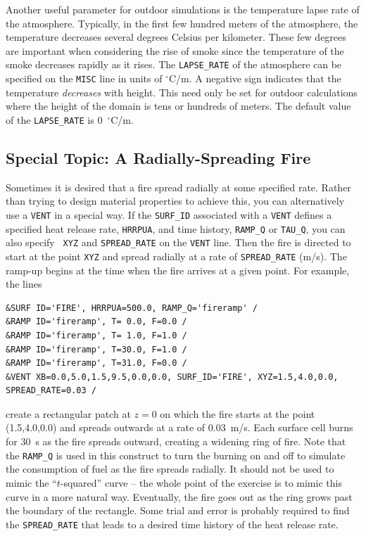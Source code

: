 \documentclass[11pt]{book}
\newcommand{\ct}{\tt\small}
\begin{document}
Another useful parameter for outdoor simulations is the temperature
lapse rate of the atmosphere. Typically, in the first few hundred meters
of the atmosphere, the temperature decreases several degrees Celsius
per kilometer. These few degrees are important when considering the rise
of smoke since the temperature of the smoke decreases rapidly as it
rises. The {\ct LAPSE\_RATE} of the atmosphere can be specified on the
{\ct MISC} line in units of $^\circ$C/m. A negative sign indicates that the
temperature {\em decreases} with height.
This need only be set for outdoor calculations where the height of the
domain is tens or hundreds of meters.
The default value of the {\ct LAPSE\_RATE} is 0~$^\circ$C/m.


\subsection{Special Topic: A Radially-Spreading Fire}

Sometimes it is desired that a fire spread radially at some specified
rate. Rather than trying to design material properties
to achieve this, you can alternatively use a {\ct VENT} in a special way.
If the {\ct SURF\_ID} associated with a {\ct VENT}
defines a specified heat release rate, {\ct HRRPUA}, and
time history, {\ct RAMP\_Q} or {\ct TAU\_Q}, you can also specify {\ct
XYZ} and {\ct SPREAD\_RATE} on the {\ct VENT} line.
Then the fire is directed to start at the point {\ct XYZ} and spread
radially at a rate of {\ct SPREAD\_RATE} (m/s). The ramp-up begins at
the time when the fire arrives at a given point.
For example, the lines

\footnotesize
\begin{verbatim}
&SURF ID='FIRE', HRRPUA=500.0, RAMP_Q='fireramp' /
&RAMP ID='fireramp', T= 0.0, F=0.0 /
&RAMP ID='fireramp', T= 1.0, F=1.0 /
&RAMP ID='fireramp', T=30.0, F=1.0 /
&RAMP ID='fireramp', T=31.0, F=0.0 /
&VENT XB=0.0,5.0,1.5,9.5,0.0,0.0, SURF_ID='FIRE', XYZ=1.5,4.0,0.0, SPREAD_RATE=0.03 /
\end{verbatim}
\normalsize
create a rectangular patch at $z=0$ on which the fire starts at the
point (1.5,4.0,0.0) and spreads outwards at a rate of 0.03~m/s. Each surface cell
burns for 30~s as the fire spreads outward, creating a widening ring of fire. Note that the {\ct RAMP\_Q} is used in this
construct to turn the burning on and off to simulate the consumption of fuel as the fire spreads radially. It should not
be used to mimic the ``$t$-squared'' curve -- the whole point of the exercise is to mimic this curve in a more natural way.
Eventually, the fire goes out as the ring grows past the boundary of the rectangle.
Some trial and error is probably required to find the {\ct SPREAD\_RATE} that
leads to a desired time history of the heat release rate.
\end{document}
